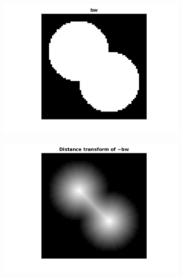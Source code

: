 \begin{figure}[htbp]
    \centering
    \begin{subfigure}[b]{0.3\textwidth}
        \includegraphics[width=\textwidth]{img/circlesEx.png}
        \caption{ }
        \label{fig:overlap}
    \end{subfigure}
     \quad
    \begin{subfigure}[b]{0.3\textwidth}
        \includegraphics[width=\textwidth]{img/distancerTransform.png}
        \caption{ }
        \label{fig:overlaptransf}
    \end{subfigure}
    \quad
    \begin{subfigure}[b]{0.3\textwidth}

\end{subfigure}
\end{figure}
